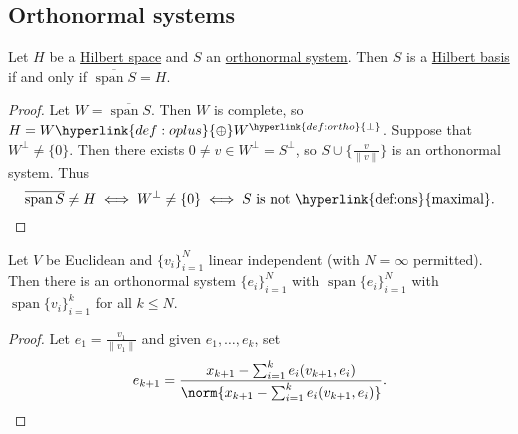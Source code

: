 \documentclass{article}
\DeclareMathOperator{\spn}{span}
\begin{document}
\subsection{Orthonormal systems}
\begin{fact}
    Let $H$ be a \hyperlink{def:euclidean}{Hilbert space} and $S$ an \hyperlink{def:ons}{orthonormal system}.
    Then $S$ is a \hyperlink{def:ons}{Hilbert basis} if and only if $\overline{\spn S} = H$.
\end{fact}

\begin{proof}
    Let $W = \overline{\spn S}$.
    Then $W$ is complete, so $H = W \hyperlink{def:oplus}{\oplus} W^{\hyperlink{def:ortho}{\perp}}$.
    Suppose that $W^\bot \neq \{0\}$.
    Then there exists $0 \neq v \in W^\bot = S^\bot$, so $S \cup \{\frac{v}{\|v\|}\}$ is an orthonormal system. Thus
    \begin{equation*}
        \overline{\spn S} \neq H \iff W^\bot \neq \{0\} \iff S \text{ is not \hyperlink{def:ons}{maximal}.} \qedhere
    \end{equation*}
\end{proof}

\begin{fact}
    Let $V$ be Euclidean and $\{v_i\}_{i=1}^N$ linear independent (with $N = \infty$ permitted).
    Then there is an orthonormal system $\{e_i\}_{i=1}^N$ with $\spn \{e_i\}_{i=1}^N$ with $\spn \{v_i\}_{i=1}^k$ for all $k \leq N$.
\end{fact}

\begin{proof}
    Let $e_1 = \frac{v_1}{\|v_1\|}$ and given $e_1, \dotsc, e_k$, set
    \begin{equation*}
        e_{k+1} = \frac{x_{k+1} - \sum_{i=1}^k e_i (v_{k+1}, e_i)}{\norm{x_{k+1} - \sum_{i=1}^k e_i (v_{k+1}, e_i)}}.\qedhere
    \end{equation*}
\end{proof}
\end{document}
